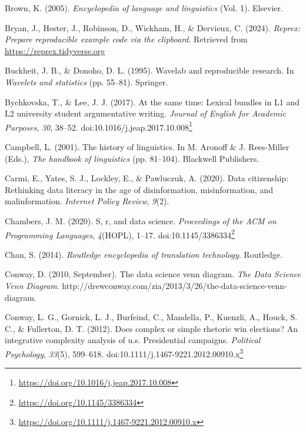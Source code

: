 \documentclass[
  letterpaper,
]{latex/krantz}
\newlength{\cslhangindent}
\newenvironment{CSLReferences}[2] %
 {\begin{list}{}{%
  \setlength{\itemindent}{0pt}
  \setlength{\leftmargin}{0pt}
  \setlength{\parsep}{0pt}
  \ifodd #1
   \setlength{\leftmargin}{\cslhangindent}
   \setlength{\itemindent}{-1\cslhangindent}
  \fi
  \setlength{\itemsep}{#2\baselineskip}}}
 {\end{list}}
\theoremstyle{definition}
\theoremstyle{remark}
\DeclareRobustCommand{\href}[2]{#2\footnote{\url{#1}}}
\begin{document}
\begin{CSLReferences}{1}{0}
Brown, K. (2005). \emph{Encyclopedia of language and linguistics} (Vol.
1). Elsevier.

Bryan, J., Hester, J., Robinson, D., Wickham, H., \& Dervieux, C.
(2024). \emph{Reprex: Prepare reproducible example code via the
clipboard}. Retrieved from \url{https://reprex.tidyverse.org}

Buckheit, J. B., \& Donoho, D. L. (1995). Wavelab and reproducible
research. In \emph{Wavelets and statistics} (pp. 55--81). Springer.

Bychkovska, T., \& Lee, J. J. (2017). At the same time: Lexical bundles
in L1 and L2 university student argumentative writing. \emph{Journal of
English for Academic Purposes}, \emph{30}, 38--52.
doi:\href{https://doi.org/10.1016/j.jeap.2017.10.008}{10.1016/j.jeap.2017.10.008}

Campbell, L. (2001). The history of linguistics. In M. Aronoff \& J.
Rees-Miller (Eds.), \emph{The handbook of linguistics} (pp. 81--104).
Blackwell Publishers.

Carmi, E., Yates, S. J., Lockley, E., \& Pawluczuk, A. (2020). Data
citizenship: Rethinking data literacy in the age of disinformation,
misinformation, and malinformation. \emph{Internet Policy Review},
\emph{9}(2).

Chambers, J. M. (2020). S, r, and data science. \emph{Proceedings of the
ACM on Programming Languages}, \emph{4}(HOPL), 1--17.
doi:\href{https://doi.org/10.1145/3386334}{10.1145/3386334}

Chan, S. (2014). \emph{Routledge encyclopedia of translation
technology}. Routledge.

Conway, D. (2010, September). The data science venn diagram. \emph{The
Data Science Venn Diagram}.
http://drewconway.com/zia/2013/3/26/the-data-science-venn-diagram.

Conway, L. G., Gornick, L. J., Burfeind, C., Mandella, P., Kuenzli, A.,
Houck, S. C., \& Fullerton, D. T. (2012). Does complex or simple
rhetoric win elections? An integrative complexity analysis of u.s.
Presidential campaigns. \emph{Political Psychology}, \emph{33}(5),
599--618.
doi:\href{https://doi.org/10.1111/j.1467-9221.2012.00910.x}{10.1111/j.1467-9221.2012.00910.x}


\end{CSLReferences}
\end{document}
